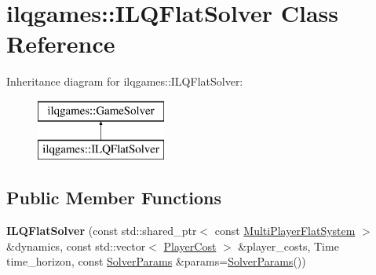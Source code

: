 \hypertarget{classilqgames_1_1_i_l_q_flat_solver}{}\section{ilqgames\+:\+:I\+L\+Q\+Flat\+Solver Class Reference}
\label{classilqgames_1_1_i_l_q_flat_solver}
Inheritance diagram for ilqgames\+:\+:I\+L\+Q\+Flat\+Solver\+:\begin{figure}[H]
\begin{center}
\leavevmode
\includegraphics[height=2.000000cm]{classilqgames_1_1_i_l_q_flat_solver}
\end{center}
\end{figure}
\subsection*{Public Member Functions}
\begin{DoxyCompactItemize}
\item 
{\bfseries I\+L\+Q\+Flat\+Solver} (const std\+::shared\+\_\+ptr$<$ const \hyperlink{classilqgames_1_1_multi_player_flat_system}{Multi\+Player\+Flat\+System} $>$ \&dynamics, const std\+::vector$<$ \hyperlink{classilqgames_1_1_player_cost}{Player\+Cost} $>$ \&player\+\_\+costs, Time time\+\_\+horizon, const \hyperlink{structilqgames_1_1_solver_params}{Solver\+Params} \&params=\hyperlink{structilqgames_1_1_solver_params}{Solver\+Params}())\hypertarget{classilqgames_1_1_i_l_q_flat_solver_a66d3b8710861b90c67ea854b4722b2a2}{}\label{classilqgames_1_1_i_l_q_flat_solver_a66d3b8710861b90c67ea854b4722b2a2}

\end{DoxyCompactItemize}
